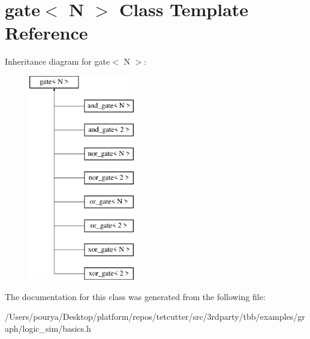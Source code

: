 \hypertarget{classgate}{}\section{gate$<$ N $>$ Class Template Reference}
\label{classgate}
Inheritance diagram for gate$<$ N $>$\+:\begin{figure}[H]
\begin{center}
\leavevmode
\includegraphics[height=9.000000cm]{classgate}
\end{center}
\end{figure}


The documentation for this class was generated from the following file\+:\begin{DoxyCompactItemize}
\item 
/\+Users/pourya/\+Desktop/platform/repos/tetcutter/src/3rdparty/tbb/examples/graph/logic\+\_\+sim/basics.\+h\end{DoxyCompactItemize}

